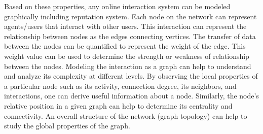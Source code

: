 Based on these properties, any online interaction system can be modeled
graphically including reputation system. Each node on the network can represent
agents/users that interact with other users. This interaction can represent the
relationship between nodes as the edges connecting vertices. The transfer of
data between the nodes can be quantified to represent the weight of the edge.
This weight value can be used to determine the strength or weakness of
relationship between the nodes. Modeling the interaction as a graph can help
to understand and analyze its complexity at different levels. By observing the
local properties of a particular node such as its activity, connection degree,
its neighbors, and interactions, one can derive useful information about a node.
Similarly, the node's relative position in a given graph can help to determine
its centrality and connectivity. An overall structure of the network (graph
topology) can help to study the global properties of the graph. 

